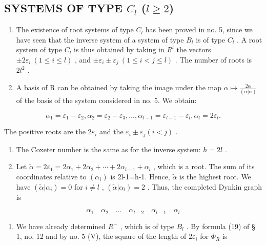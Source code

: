 \subsection{\texorpdfstring{SYSTEMS OF TYPE \(C_{l}\) (\(l \geqslant 2\))}{SYSTEMS OF TYPE C\_l (l >= 2)}}

\begin{enumerate}
\def\labelenumi{(\Roman{enumi})}
\item
  The existence of root systems of type \(C_{l}\) has been proved in no. 5, since we have seen that the inverse system of a system of type \(B_{l}\) is of type \(C_{l}\) . A root system of type \(C_{l}\) is thus obtained by taking in \(R^{l}\) the vectors \(\pm2\varepsilon_{i}\ (1\leqslant i\leqslant l)\) , and \(\pm\varepsilon_{i}\pm\varepsilon_{j}\ (1\leqslant i<j\leqslant l)\) . The number of roots is \(2l^{2}\) .
\item
  A basis of R can be obtained by taking the image under the map \(\alpha\mapsto\frac{2\alpha}{(\alpha|\alpha)}\) of the basis of the system considered in no. 5. We obtain:
\end{enumerate}

\[
\alpha_ {1} = \varepsilon_ {1} - \varepsilon_ {2}, \alpha_ {2} = \varepsilon_ {2} - \varepsilon_ {3}, \dots , \alpha_ {l - 1} = \varepsilon_ {l - 1} - \varepsilon_ {l}, \alpha_ {l} = 2 \varepsilon_ {l}.
\]

The positive roots are the \(2\varepsilon_{i}\) and the \(\varepsilon_{i} \pm \varepsilon_{j} (i < j)\) .

\begin{enumerate}
\def\labelenumi{(\Roman{enumi})}
\setcounter{enumi}{2}
\item
  The Coxeter number is the same as for the inverse system: \(h = 2l\) .
\item
  Let \(\tilde{\alpha}=2\varepsilon_{1}=2\alpha_{1}+2\alpha_{2}+\cdots+2\alpha_{l-1}+\alpha_{l}\) , which is a root. The sum of its coordinates relative to \((\alpha_{i})\) is 2l-1=h-1. Hence, \(\tilde{\alpha}\) is the highest root. We have \((\tilde{\alpha}|\alpha_{i})=0\) for \(i\neq l\) , \((\tilde{\alpha}|\alpha_{l})=2\) . Thus, the completed Dynkin graph is
\end{enumerate}

\[
\alpha_ {1} \quad \alpha_ {2} \quad \dots \quad \alpha_ {l - 2} \quad \alpha_ {l - 1} \quad \alpha_ {l}
\]

\begin{enumerate}
\def\labelenumi{(\Alph{enumi})}
\setcounter{enumi}{21}
\tightlist
\item
  We have already determined \(R^{-}\) , which is of type \(B_{l}\) . By formula (19) of § 1, no. 12 and by no. 5 (V), the square of the length of \(2\varepsilon_{i}\) for \(\Phi_{R}\) is
\end{enumerate}

